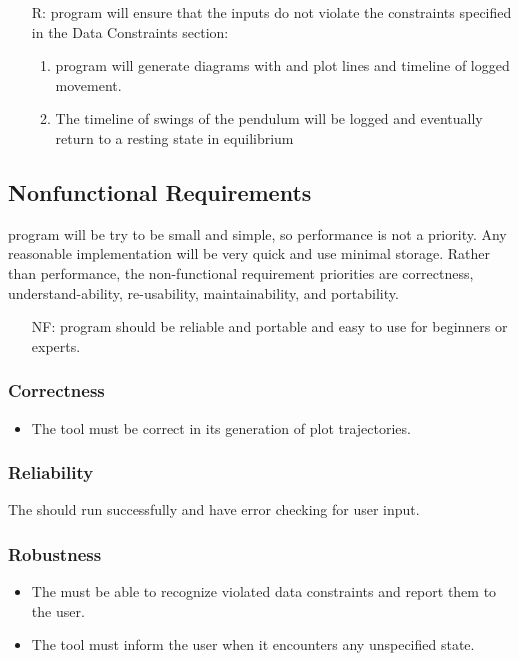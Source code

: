 \documentclass[12pt]{article}
\newcounter{reqnum} %
\newcounter{nfreqnum} %
\begin{document}
\begin{itemize}
\item[R\refstepcounter{reqnum}\thereqnum \label{funplot}:] \progname program
will ensure that the inputs do not violate the constraints specified in the 
Data Constraints section:
    \begin{enumerate} \item \progname program will 
generate diagrams with and plot lines and timeline of logged movement. 
\item The timeline of swings of the pendulum will be logged and eventually
return to a resting state in equilibrium
\end{enumerate}

\end{itemize}
\newpage
\subsection{Nonfunctional Requirements}

\progname program will be try to be small and simple, so performance is not a 
priority. Any reasonable implementation will be very quick and use minimal 
storage. Rather than performance, the non-functional requirement priorities 
are correctness, understand-ability, re-usability, maintainability, and 
portability. 

\begin{itemize}
\item[NF\refstepcounter{nfreqnum}\thenfreqnum:] \progname program should be 
reliable and portable and easy to use for beginners or experts.
\end{itemize}

\subsubsection*{Correctness}
\begin{itemize}
\item The \progname tool must be correct in its generation 
of plot trajectories.
\end{itemize}

\subsubsection*{Reliability}

The \progname should run successfully and have error checking for user input.

\subsubsection*{Robustness}
\begin{itemize}
	\item The \progname must be able to recognize violated data 
	constraints and report them to the user.
	\item The \progname tool must inform the user when it encounters any 
	unspecified state.
\end{itemize}
\end{document}
